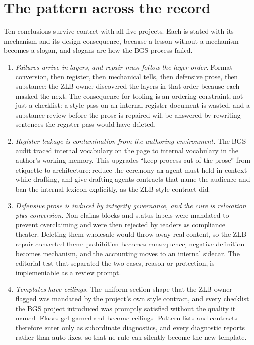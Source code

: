 \section{The pattern across the record}
\label{sec:lessons}

Ten conclusions survive contact with all five projects. Each is stated with
its mechanism and its design consequence, because a lesson without a
mechanism becomes a slogan, and slogans are how the BGS process failed.

\begin{enumerate}

\item \emph{Failures arrive in layers, and repair must follow the layer
order.} Format conversion, then register, then mechanical tells, then
defensive prose, then substance: the ZLB owner discovered the layers in that
order because each masked the next. The consequence for tooling is an
ordering constraint, not just a checklist: a style pass on an
internal-register document is wasted, and a substance review before the prose
is repaired will be answered by rewriting sentences the register pass would
have deleted.

\item \emph{Register leakage is contamination from the authoring
environment.} The BGS audit traced internal vocabulary on the page to
internal vocabulary in the author's working memory. This upgrades ``keep
process out of the prose'' from etiquette to architecture: reduce the
ceremony an agent must hold in context while drafting, and give drafting
agents contracts that name the audience and ban the internal lexicon
explicitly, as the ZLB style contract did.

\item \emph{Defensive prose is induced by integrity governance, and the cure
is relocation plus conversion.} Non-claims blocks and status labels were
mandated to prevent overclaiming and were then rejected by readers as
compliance theater. Deleting them wholesale would throw away real content, so
the ZLB repair converted them: prohibition becomes consequence, negative
definition becomes mechanism, and the accounting moves to an internal sidecar.
The editorial test that separated the two cases, reason or protection, is
implementable as a review prompt.

\item \emph{Templates have ceilings.} The uniform section shape that the ZLB
owner flagged was mandated by the project's own style contract, and every
checklist the BGS project introduced was promptly satisfied without the
quality it named. Floors get gamed and become ceilings. Pattern lists and
contracts therefore enter \hv{} only as subordinate diagnostics, and every
diagnostic reports rather than auto-fixes, so that no rule can silently
become the new template.


\end{enumerate}
